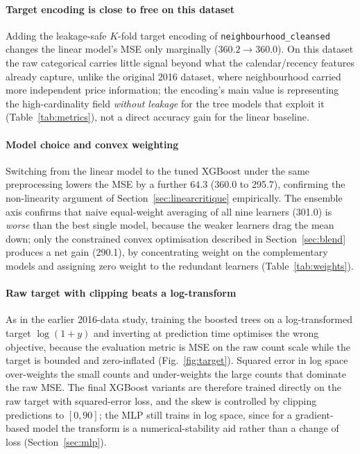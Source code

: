 \documentclass[journal]{IEEEtran}
\begin{document}
\paragraph{Target encoding is close to free on this dataset} Adding the
leakage-safe $K$-fold target encoding of \texttt{neighbourhood\_cleansed}
changes the linear model's MSE only marginally ($360.2\!\rightarrow\!360.0$).
On this dataset the raw categorical carries little signal beyond what the
calendar/recency features already capture, unlike the original 2016 dataset,
where neighbourhood carried more independent price information; the encoding's
main value is representing the high-cardinality field \emph{without leakage}
for the tree models that exploit it (Table~\ref{tab:metrics}), not a direct
accuracy gain for the linear baseline.

\paragraph{Model choice and convex weighting} Switching from the linear model
to the tuned XGBoost under the same preprocessing lowers the MSE by a further
$64.3$ (360.0 to 295.7), confirming the non-linearity argument of
Section~\ref{sec:linearcritique} empirically. The ensemble axis confirms that
naive equal-weight averaging of all nine learners (301.0) is \emph{worse} than
the best single model, because the weaker learners drag the mean down; only
the constrained convex optimisation described in Section~\ref{sec:blend}
produces a net gain (290.1), by concentrating weight on the complementary
models and assigning zero weight to the redundant learners
(Table~\ref{tab:weights}).

\paragraph{Raw target with clipping beats a log-transform} As in the earlier
2016-data study, training the boosted trees on a log-transformed target
$\log(1+y)$ and inverting at prediction time optimises the wrong objective,
because the evaluation metric is MSE on the raw count scale while the target
is bounded and zero-inflated (Fig.~\ref{fig:target}). Squared error in log
space over-weights the small counts and under-weights the large counts that
dominate the raw MSE. The final XGBoost variants are therefore trained
directly on the raw target with squared-error loss, and the skew is controlled
by clipping predictions to $[0,90]$; the MLP still trains in log space, since
for a gradient-based model the transform is a numerical-stability aid rather
than a change of loss (Section~\ref{sec:mlp}).
\end{document}

